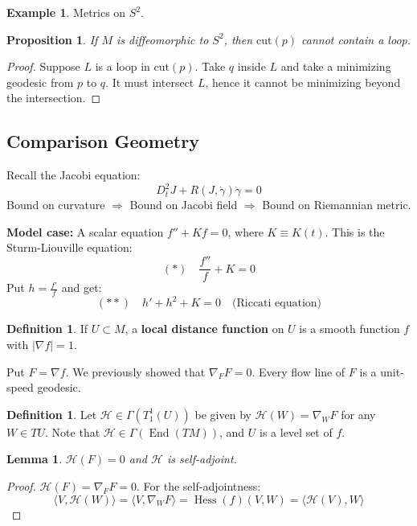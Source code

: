 \documentclass[11pt, a4paper]{article}
\theoremstyle{plain}
\newtheorem{lemma}[theorem]{Lemma}
\newtheorem{proposition}[theorem]{Proposition}
\theoremstyle{definition}
\newtheorem{definition}[theorem]{Definition}
\newtheorem{example}[theorem]{Example}
\theoremstyle{remark}
\begin{document}
{\begin{example}
Metrics on $S^2$.
\end{example}

\begin{proposition}
If $M$ is diffeomorphic to $S^2$, then $\text{cut}(p)$ cannot contain a loop.
\end{proposition}

\begin{proof}
Suppose $L$ is a loop in $\text{cut}(p)$. Take $q$ inside $L$ and take a minimizing geodesic from $p$ to $q$. It must intersect $L$, hence it cannot be minimizing beyond the intersection.
\end{proof}

\subsection{Comparison Geometry}

Recall the Jacobi equation:
\[ D_t^2 J + R(J, \dot{\gamma})\dot{\gamma} = 0 \]
Bound on curvature $\Rightarrow$ Bound on Jacobi field $\Rightarrow$ Bound on Riemannian metric.

\textbf{Model case:} A scalar equation $f'' + K f = 0$, where $K \equiv K(t)$.
This is the Sturm-Liouville equation:
\[ (*) \quad \frac{f''}{f} + K = 0 \]
Put $h = \frac{f'}{f}$ and get:
\[ (**) \quad h' + h^2 + K = 0 \quad \text{(Riccati equation)} \]

\begin{definition}
If $U \subset M$, a \textbf{local distance function} on $U$ is a smooth function $f$ with $|\nabla f| = 1$.
\end{definition}

Put $F = \nabla f$. We previously showed that $\nabla_F F = 0$. Every flow line of $F$ is a unit-speed geodesic.

\begin{definition}
Let $\mathcal{H} \in \Gamma(T_1^1(U))$ be given by $\mathcal{H}(W) = \nabla_W F$ for any $W \in TU$. Note that $\mathcal{H} \in \Gamma(\operatorname{End}(TM))$, and $U$ is a level set of $f$.
\end{definition}

\begin{lemma}
$\mathcal{H}(F) = 0$ and $\mathcal{H}$ is self-adjoint.
\end{lemma}

\begin{proof}
$\mathcal{H}(F) = \nabla_F F = 0$.
For the self-adjointness:
\[ \langle V, \mathcal{H}(W) \rangle = \langle V, \nabla_W F \rangle = \operatorname{Hess}(f)(V, W) = \langle \mathcal{H}(V), W \rangle \]
\end{proof}

}
\end{document}
